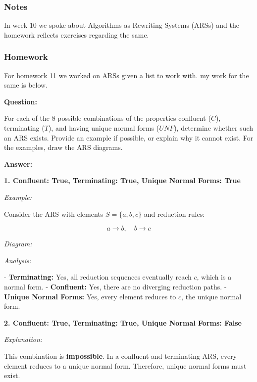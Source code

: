\documentclass{article}
\theoremstyle{theorem}
\theoremstyle{definition}
\theoremstyle{remark}
\begin{document}
\subsubsection*{Notes}
In week 10 we spoke about Algorithms as Rewriting Systems (ARSs) and the homework reflects exercises regarding the same.

\subsubsection*{Homework}
For homework 11 we worked on ARSs given a list to work with. my work for the same is below.

\textbf{Question:}

For each of the 8 possible combinations of the properties confluent (\( C \)), terminating (\( T \)), and having unique normal forms (\( UNF \)), determine whether such an ARS exists. Provide an example if possible, or explain why it cannot exist. For the examples, draw the ARS diagrams.

\textbf{Answer:}

\textbf{1. Confluent: True, Terminating: True, Unique Normal Forms: True}

\textit{Example:}

Consider the ARS with elements \( S = \{ a, b, c \} \) and reduction rules:

\[
  a \to b, \quad b \to c
\]

\textit{Diagram:}

\begin{center}
\end{center}

\textit{Analysis:}

- \textbf{Terminating:} Yes, all reduction sequences eventually reach \( c \), which is a normal form.
- \textbf{Confluent:} Yes, there are no diverging reduction paths.
- \textbf{Unique Normal Forms:} Yes, every element reduces to \( c \), the unique normal form.


\textbf{2. Confluent: True, Terminating: True, Unique Normal Forms: False}

\textit{Explanation:}

This combination is \textbf{impossible}. In a confluent and terminating ARS, every element reduces to a unique normal form. Therefore, unique normal forms must exist.
\end{document}
